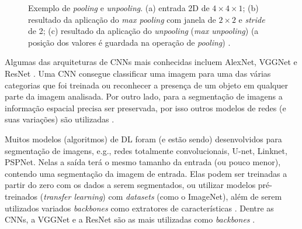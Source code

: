 \documentclass[12pt, a4paper, english, brazil]{article}
\begin{document}
\begin{figure}[htbp]
    \centering
    \caption{Exemplo de \textit{pooling} e \textit{unpooling}. (a) entrada 2D de $4\times4\times1$; (b) resultado da aplicação do \textit{max pooling} com janela de $2\times2$ e \textit{stride} de 2; (c) resultado da aplicação do \textit{unpooling} (\textit{max unpooling}) (a posição dos valores é guardada na operação de \textit{pooling}) \cite{Fang_2017}.}
    \label{fig:pooling}
\end{figure}

Algumas das arquiteturas de CNNs mais conhecidas incluem AlexNet, VGGNet e ResNet \cite{Minaee_2021}. Uma CNN consegue classificar uma imagem para uma das várias categorias que foi treinada ou reconhecer a presença de um objeto em qualquer parte da imagem analisada. Por outro lado, para a segmentação de imagens a informação espacial precisa ser preservada, por isso outros modelos de redes (e suas variações) são utilizadas \cite{Ponti_2017}.

Muitos modelos (algoritmos) de DL foram (e estão sendo) desenvolvidos para segmentação de imagens, e.g., redes totalmente convolucionais, U-net, Linknet, PSPNet. Nelas a saída terá o mesmo tamanho da entrada (ou pouco menor), contendo uma segmentação da imagem de entrada. Elas podem ser treinadas a partir do zero com os dados a serem segmentados, ou utilizar modelos pré-treinados (\textit{transfer learning}) com \textit{datasets} (como o ImageNet), além de serem utilizados variados \textit{backbones} como extratores de características \cite{Hao_2020, Minaee_2021}. Dentre as CNNs, a VGGNet e a ResNet são as mais utilizadas como \textit{backbones} \cite{Lateef_2019}.
\end{document}
